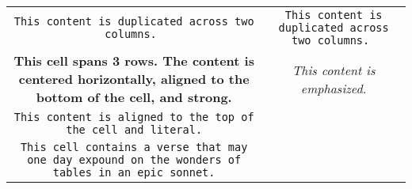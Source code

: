 \begin{center}
\begin{tabular}{|c|c|}
\hline
\texttt{This content is duplicated across two columns.
} & \texttt{This content is duplicated across two columns.
} \\
\textbf{This cell spans 3 rows. The content is centered horizontally, aligned to the bottom of the cell, and strong.} & \emph{This content is emphasized.} \\
\texttt{This content is aligned to the top of the cell and literal.} \\
\texttt{This cell contains a verse
that may one day expound on the
wonders of tables in an
epic sonnet.} \\
\hline
\end{tabular}
\end{center}
